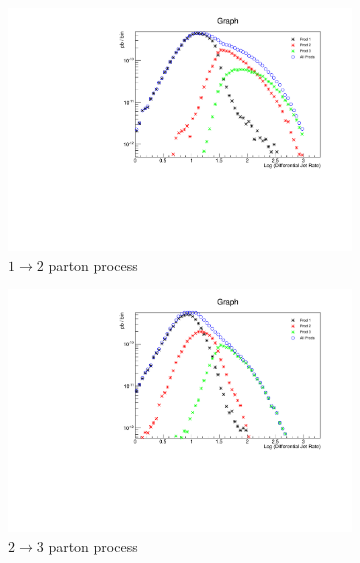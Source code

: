 \begin{figure} [thbp]
  \center
  \begin{subfigure}{0.48\linewidth}
    \includegraphics[width=\linewidth]{figures/monojet_appendix/HistoJet1to2_30.pdf}
    \caption{$1\rightarrow2$ parton process}
  \end{subfigure}
  \begin{subfigure}{0.48\linewidth}
    \includegraphics[width=\linewidth]{figures/monojet_appendix/HistoJet2to3_30.pdf}
    \caption{$2\rightarrow3$ parton process}
  \end{subfigure}
  \begin{subfigure}{0.48\linewidth}

\end{subfigure}
\end{figure}
